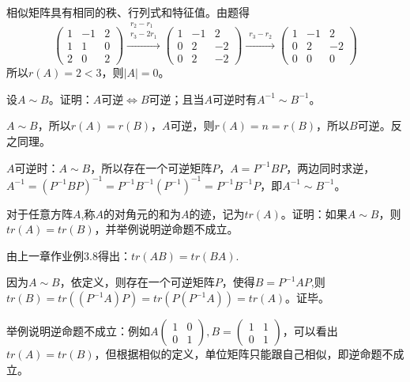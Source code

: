 \documentclass[a4paper]{report}
\begin{document}
\begin{jie}
相似矩阵具有相同的秩、行列式和特征值。由题得
\begin{equation*}
\begin{pmatrix}
1&-1&2\\
1&1&0\\
2&0&2
\end{pmatrix}\xrightarrow{\substack{r_{2}-r_{1}\\ r_3-2r_1}}
{
\begin{pmatrix}
1&-1&2\\
0&2&-2\\
0&2&-2
\end{pmatrix}
}\xrightarrow{\substack{ r_3-r_2}}
{
\begin{pmatrix}
1&-1&2\\
0&2&-2\\
0&0&0
\end{pmatrix}
}
\end{equation*}
所以$r(A)=2<3$，则$|A|=0$。
\end{jie}

\EX 设$A\sim B$。证明：$A$可逆$\Leftrightarrow B$可逆；且当$A$可逆时有$A^{-1}\sim B^{-1}$。

\begin{zhengming}
$A\sim B$，所以$r(A)=r(B)$，$A$可逆，则$r(A)=n=r(B)$，所以$B$可逆。反之同理。

$A$可逆时：$A\sim B$，所以存在一个可逆矩阵$P$，$A=P^{-1}BP$，两边同时求逆，$A^{-1}=(P^{-1}BP)^{-1}=P^{-1}B^{-1}(P^{-1})^{-1}=P^{-1}B^{-1}P$，即$A^{-1}\sim B^{-1}$。
\end{zhengming}

\EX 对于任意方阵$A$,称$A$的对角元的和为$A$的迹，记为$tr(A)$。证明：如果$A\sim B$，则$tr(A)=tr(B)$，并举例说明逆命题不成立。

\begin{zhengming}
由上一章作业例3.8得出：$tr(AB)=tr(BA)$.

因为$A\sim B$，依定义，则存在一个可逆矩阵$P$，使得$B=P^{-1}AP$,则$tr(B)=tr((P^{-1}A)P)=tr(P(P^{-1}A))=tr(A)$。证毕。

举例说明逆命题不成立：例如$A
\begin{pmatrix}
1&0\\0&1
\end{pmatrix},B=
\begin{pmatrix}
1&1\\
0&1
\end{pmatrix}
$，可以看出$tr(A)=tr(B)$，但根据相似的定义，单位矩阵只能跟自己相似，即逆命题不成立。
\end{zhengming}
\end{document}
